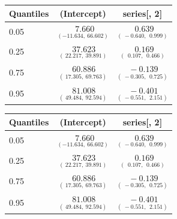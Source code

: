 \documentclass[paper=a4, fontsize=11pt]{scrartcl}
\numberwithin{equation}{section}		%
\numberwithin{figure}{section}			%
\numberwithin{table}{section}				%
\begin{document}
\begin{table}[hptb]
\begin{center}
\begin{tabular}{|l||c|c|} \hline
\multicolumn{1}{|l||}{Quantiles}&\multicolumn{1}{c|}{(Intercept)}&\multicolumn{1}{c|}{series[, 2]}\\ \hline
0.05&$\underset{(-11.634,~66.602)}{~~7.660}$&$\underset{(~-0.640,~~0.999)}{~~0.639}$\\ 
0.25&$\underset{(~22.217,~39.891)}{~37.623}$&$\underset{(~~0.107,~~0.466)}{~~0.169}$\\ 
0.75&$\underset{(~17.305,~69.763)}{~60.886}$&$\underset{(~-0.305,~~0.725)}{~-0.139}$\\ 
0.95&$\underset{(~49.484,~92.594)}{~81.008}$&$\underset{(~-0.551,~~2.151)}{~-0.401}$\\ 
\hline
\end{tabular}
\vspace{3mm}
\end{center}
\end{table}

\begin{table}[hptb]
\begin{center}
\begin{tabular}{|l||c|c|} \hline
\multicolumn{1}{|l||}{Quantiles}&\multicolumn{1}{c|}{(Intercept)}&\multicolumn{1}{c|}{series[, 2]}\\ \hline
0.05&$\underset{(-11.634,~66.602)}{~~7.660}$&$\underset{(~-0.640,~~0.999)}{~~0.639}$\\ 
0.25&$\underset{(~22.217,~39.891)}{~37.623}$&$\underset{(~~0.107,~~0.466)}{~~0.169}$\\ 
0.75&$\underset{(~17.305,~69.763)}{~60.886}$&$\underset{(~-0.305,~~0.725)}{~-0.139}$\\ 
0.95&$\underset{(~49.484,~92.594)}{~81.008}$&$\underset{(~-0.551,~~2.151)}{~-0.401}$\\ 
\hline
\end{tabular}
\vspace{3mm}
\end{center}
\end{table}



\clearpage


\end{document}
